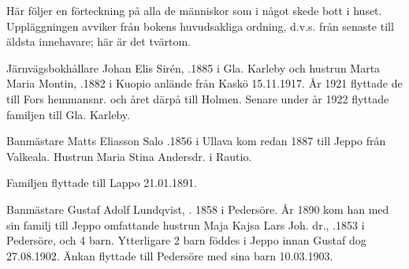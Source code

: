 Här följer en förteckning på alla de människor som i något skede bott i huset. Uppläggningen avviker från bokens huvudsakliga ordning, d.v.s. från senaste till äldsta innehavare; här är det tvärtom.


Järnvägsbokhållare Johan Elis Sirén, .1885 i Gla. Karleby och hustrun Marta Maria Montin, .1882 i Kuopio anlände från Kaskö 15.11.1917. År 1921 flyttade de till Fors hemmansnr. och året därpå till Holmen. Senare under år 1922 flyttade familjen till Gla. Karleby.
\begin{jhchildren}
  \item {}
  \item {}
\end{jhchildren}


Banmästare Matts Eliasson Salo .1856 i Ullava kom redan 1887 till Jeppo från Valkeala. Hustrun Maria Stina Andersdr.  i Rautio.
\begin{jhchildren}
  \item {}
  \item {}
  \item {}
\end{jhchildren}
Familjen flyttade till Lappo 21.01.1891.


Banmästare Gustaf Adolf Lundqvist, . 1858 i Pedersöre. År 1890 kom han med sin familj till Jeppo omfattande hustrun Maja Kajsa Lars Joh. dr., .1853 i Pedersöre, och 4 barn. Ytterligare 2 barn föddes i Jeppo innan Gustaf dog 27.08.1902. Änkan flyttade till Pedersöre med sina barn 10.03.1903.
\begin{jhchildren}
  \item {}
  \item {}
  \item {}
  \item {}
  \item {}
  \item {}
\end{jhchildren}


